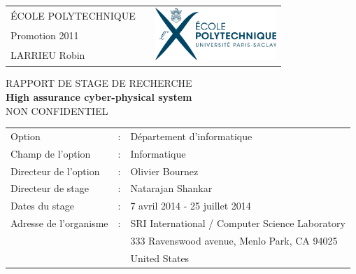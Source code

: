 \documentclass[12pt,a4paper]{article}
\begin{document}
\thispagestyle{empty}

\hspace{-0.7cm}
\begin{tabular}{lrr}
\noindent \'ECOLE POLYTECHNIQUE & \multirow{3}{6cm}{} &\multirow{3}{5cm}{\includegraphics[height=2cm]{logo-ecole.eps}}\\
Promotion 2011 & &\\
LARRIEU Robin & & \\
\end{tabular}


\begin{center}
\Large{RAPPORT DE STAGE DE RECHERCHE \\}
\vspace{1cm}
\Huge{\textbf{High assurance cyber-physical system} \\}
\vspace{1cm}
\large{NON CONFIDENTIEL}
\end{center}


\begin{tabular}{lcl}
Option & : & Département d'informatique \\
Champ de l'option & : & Informatique \\
Directeur de l'option & : & Olivier Bournez \\
Directeur de stage & : & Natarajan Shankar \\
Dates du stage & : & 7 avril 2014 - 25 juillet 2014 \\
Adresse de l'organisme & : & SRI International / Computer Science Laboratory\\
& & 333 Ravenswood avenue, Menlo Park, CA 94025 \\
& & United States \\   
\end{tabular}

\newpage

\end{document}
